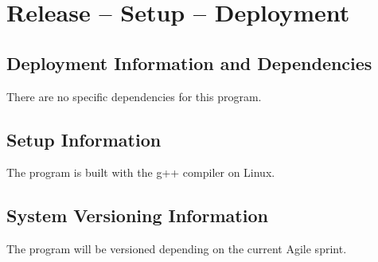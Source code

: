 
\chapter{Release -- Setup -- Deployment}


\section{Deployment Information and Dependencies}
There are no specific dependencies for this program.



\section{Setup Information}
The program is built with the g++ compiler on Linux.



\section{System  Versioning Information}
The program will be versioned depending on the current Agile sprint.